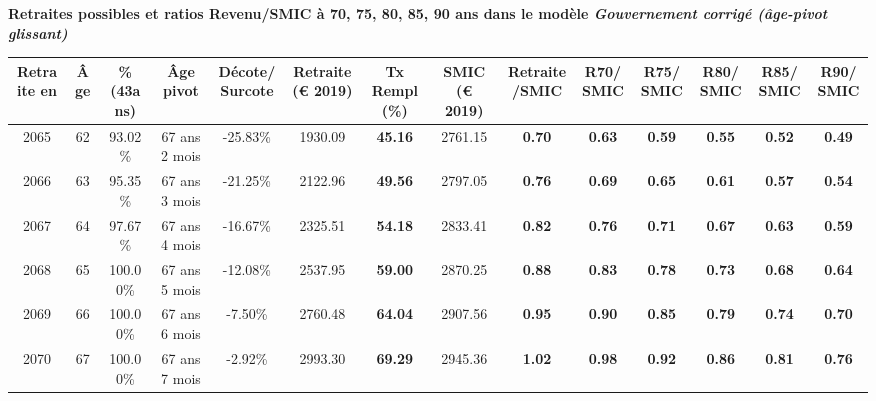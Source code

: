  \vspace{0.1cm} 
{\bf \noindent Retraites possibles et ratios Revenu/SMIC à 70, 75, 80, 85, 90 ans dans le modèle \emph{Gouvernement corrigé (âge-pivot glissant)}}  
 
\begin{adjustbox}{max width=\textwidth} 
\begin{tabular}[htb]{|c|c||c|c|c||c|c||c|c||c|c|c|c|c|} 
\hline 
 Retraite en &  Âge &  \%(43ans) &  Âge pivot &  Décote/Surcote &  Retraite (\euro{} 2019) &  Tx Rempl(\%) &  SMIC (\euro{} 2019) &  Retraite/SMIC &  R70/SMIC &  R75/SMIC &  R80/SMIC &  R85/SMIC &  R90/SMIC \\ 
\hline \hline 
 2065 &  62 &  93.02\% &  67 ans 2 mois &  -25.83\% &  1930.09 &  {\bf 45.16} &  2761.15 &  {\bf {\color{red} 0.70}} &  {\bf {\color{red} 0.63}} &  {\bf {\color{red} 0.59}} &  {\bf {\color{red} 0.55}} &  {\bf {\color{red} 0.52}} &  {\bf {\color{red} 0.49}} \\ 
\hline 
 2066 &  63 &  95.35\% &  67 ans 3 mois &  -21.25\% &  2122.96 &  {\bf 49.56} &  2797.05 &  {\bf {\color{red} 0.76}} &  {\bf {\color{red} 0.69}} &  {\bf {\color{red} 0.65}} &  {\bf {\color{red} 0.61}} &  {\bf {\color{red} 0.57}} &  {\bf {\color{red} 0.54}} \\ 
\hline 
 2067 &  64 &  97.67\% &  67 ans 4 mois &  -16.67\% &  2325.51 &  {\bf 54.18} &  2833.41 &  {\bf {\color{red} 0.82}} &  {\bf {\color{red} 0.76}} &  {\bf {\color{red} 0.71}} &  {\bf {\color{red} 0.67}} &  {\bf {\color{red} 0.63}} &  {\bf {\color{red} 0.59}} \\ 
\hline 
 2068 &  65 &  100.00\% &  67 ans 5 mois &  -12.08\% &  2537.95 &  {\bf 59.00} &  2870.25 &  {\bf {\color{red} 0.88}} &  {\bf {\color{red} 0.83}} &  {\bf {\color{red} 0.78}} &  {\bf {\color{red} 0.73}} &  {\bf {\color{red} 0.68}} &  {\bf {\color{red} 0.64}} \\ 
\hline 
 2069 &  66 &  100.00\% &  67 ans 6 mois &  -7.50\% &  2760.48 &  {\bf 64.04} &  2907.56 &  {\bf {\color{red} 0.95}} &  {\bf {\color{red} 0.90}} &  {\bf {\color{red} 0.85}} &  {\bf {\color{red} 0.79}} &  {\bf {\color{red} 0.74}} &  {\bf {\color{red} 0.70}} \\ 
\hline 
 2070 &  67 &  100.00\% &  67 ans 7 mois &  -2.92\% &  2993.30 &  {\bf 69.29} &  2945.36 &  {\bf 1.02} &  {\bf {\color{red} 0.98}} &  {\bf {\color{red} 0.92}} &  {\bf {\color{red} 0.86}} &  {\bf {\color{red} 0.81}} &  {\bf {\color{red} 0.76}} \\ 
\hline 
\hline 
\end{tabular} 
\end{adjustbox} 
 
